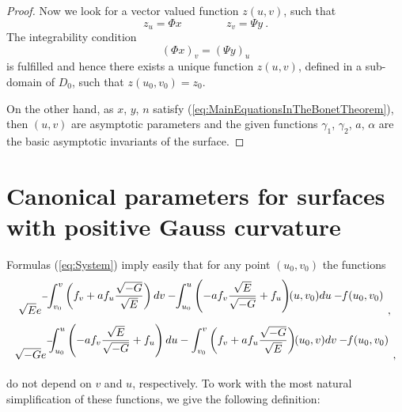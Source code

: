 \documentclass[12pt]{amsart}
\theoremstyle{definition}
\theoremstyle{remark}
\newcommand{\ds}{\displaystyle}
\begin{document}
\begin{proof}
Now we look for a vector valued function $z(u,v)$, such that
$$
	z_u=\Phi x  \qquad\qquad z_v=\Psi y \ .
$$
The integrability condition 
$$
	(\Phi x)_v=(\Psi y)_u 
$$
is fulfilled and hence there exists a unique function $z(u,v)$, 
defined in a sub-domain of $D_0$, such that $z(u_0,v_0)=z_0$.

On the other hand, as  $x$, $y$, $n$ satisfy (\ref{eq:MainEquationsInTheBonetTheorem}), 
then  $(u,v)$ are asymptotic parameters and the given functions 
$\gamma_1$, $\gamma_2$, $a$, $\alpha$ are the basic asymptotic invariants
of the surface. 

\end{proof}


\vspace{0.5cm}





\setcounter{equation}{0}

\section{Canonical parameters for surfaces with positive Gauss curvature}


Formulas (\ref{eq:System}) imply easily that for any point $(u_0,v_0)$  the functions
\begin{equation} \label{eq:phi-psi}
	\begin{array}{l} 
		\vspace{2mm}
		\ \ds\sqrt Ee^{-\ds\hspace{-1mm}\int_{v_0}^v\left(f_v+af_u\frac{\sqrt{-G}}{\sqrt E}\right)dv
		                -\hspace{-1mm}\int_{u_0}^u\left(-af_v\frac{\sqrt E}{\sqrt{-G}}+f_u\right)\hspace{-1mm}(u,v_0)du-\hspace{-1mm}f(u_0,v_0)} \ ,  \\
		\vspace{2mm}
		\ds\sqrt {-G}e^{-\ds\hspace{-1mm}\hspace{-1mm}\int_{u_0}^u\left(-af_v\frac{\sqrt E}{\sqrt{-G}}+f_u\right)du
		                -\int_{v_0}^v\left(f_v+af_u\frac{\sqrt{-G}}{\sqrt E}\right)\hspace{-1mm}(u_0,v)dv-\hspace{-1mm}f(u_0,v_0)}  \ ,          
	\end{array}   
\end{equation}
do not depend on $v$ and $u$, respectively. 
To work with the most natural simplification of these functions, we give the following definition: 
\end{document}
